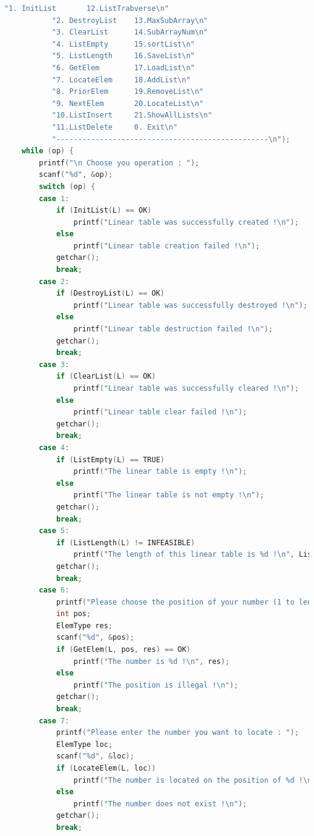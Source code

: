 \documentclass[supercite]{Experimental_Report}
\theoremstyle{definition}
\begin{document}
\begin{lstlisting}[language=c]
           "1. InitList       12.ListTrabverse\n"
           "2. DestroyList    13.MaxSubArray\n"
           "3. ClearList      14.SubArrayNum\n"
           "4. ListEmpty      15.sortList\n"
           "5. ListLength     16.SaveList\n"
           "6. GetElem        17.LoadList\n"
           "7. LocateElem     18.AddList\n"
           "8. PriorElem      19.RemoveList\n"
           "9. NextElem       20.LocateList\n"
           "10.ListInsert     21.ShowAllLists\n"
           "11.ListDelete     0. Exit\n"
           "-------------------------------------------------\n");
    while (op) {
        printf("\n Choose you operation : ");
        scanf("%d", &op);
        switch (op) {
        case 1:
            if (InitList(L) == OK)
                printf("Linear table was successfully created !\n");
            else
                printf("Linear table creation failed !\n");
            getchar();
            break;
        case 2:
            if (DestroyList(L) == OK)
                printf("Linear table was successfully destroyed !\n");
            else
                printf("Linear table destruction failed !\n");
            getchar();
            break;
        case 3:
            if (ClearList(L) == OK)
                printf("Linear table was successfully cleared !\n");
            else
                printf("Linear table clear failed !\n");
            getchar();
            break;
        case 4:
            if (ListEmpty(L) == TRUE)
                printf("The linear table is empty !\n");
            else
                printf("The linear table is not empty !\n");
            getchar();
            break;
        case 5:
            if (ListLength(L) != INFEASIBLE)
                printf("The length of this linear table is %d !\n", ListLength(L));
            getchar();
            break;
        case 6:
            printf("Please choose the position of your number (1 to length) : ");
            int pos;
            ElemType res;
            scanf("%d", &pos);
            if (GetElem(L, pos, res) == OK)
                printf("The number is %d !\n", res);
            else
                printf("The position is illegal !\n");
            getchar();
            break;
        case 7:
            printf("Please enter the number you want to locate : ");
            ElemType loc;
            scanf("%d", &loc);
            if (LocateElem(L, loc))
                printf("The number is located on the position of %d !\n", LocateElem(L, loc));
            else
                printf("The number does not exist !\n");
            getchar();
            break;

\end{lstlisting}
\end{document}
